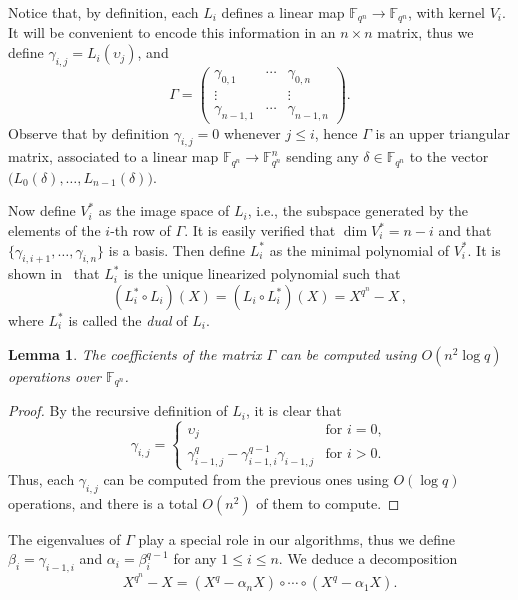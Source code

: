 \documentclass{sig-alternate}
\newcommand{\ff}[1]{\mathbb{F}_{#1}}
\newcommand{\qq}{q}
\newcommand{\nn}{n}
\newcommand{\qn}{{\qq^\nn}}
\newcommand{\extf}{\ff{\qn}}
\newcounter{algo}
\newtheorem{Lem}{Lemma}
\begin{document}
Notice that, by definition, each $L_i$ defines a linear map
$\extf\to\extf$, with kernel $V_i$. It will be convenient to encode
this information in an $\nn\times\nn$ matrix, thus we define
$\gamma_{i,j}=L_i(\upsilon_j)$, and
\begin{equation}
  \label{eq:Gamma}
  \Gamma =
  \begin{pmatrix}
    \gamma_{0,1} & \cdots & \gamma_{0,\nn}\\
    \vdots & & \vdots\\
    \gamma_{\nn-1,1} & \cdots & \gamma_{\nn-1,\nn}
  \end{pmatrix}.
\end{equation}
Observe that by definition $\gamma_{i,j}=0$ whenever $j\le i$, hence
$\Gamma$ is an upper triangular matrix, associated to a linear map
$\extf\to\extf^\nn$ sending any $\delta\in\extf$ to the vector
$\bigl(L_0(\delta),\dots,\allowbreak L_{n-1}(\delta)\bigr)$.  

Now define $V_i^\ast$ as the image space of $L_i$, i.e., the subspace
generated by the elements of the $i$-th row of $\Gamma$.  It is easily verified that
$\dim V_i^\ast=n-i$ and that $\{\gamma_{i,i+1},\dots,\gamma_{i,\nn}\}$
is a basis. Then define $L_i^\ast$ as the minimal polynomial of
$V_i^\ast$. It is shown in~\cite[Ch. 11]{mBER84a} that
$L_i^\ast$ is the unique linearized polynomial such that
$$(L_i^\ast \circ L_i)(X)=(L_i \circ L_i^\ast)(X)=X^\qn-X\,,$$
where $L_i^\ast$ is called the \emph{dual} of $L_i$.

\begin{Lem}
  The coefficients of the matrix $\Gamma$ can be computed using
  $O(\nn^2\log\qq)$ operations over $\extf$.
\end{Lem}
\begin{proof}
  By the recursive definition of $L_i$, it is clear that
  \begin{equation}
    \gamma_{i,j} =
    \begin{cases}
      \upsilon_j &\text{for $i=0$},\\
      \gamma_{i-1,j}^\qq - \gamma_{i-1,i}^{\qq-1}\gamma_{i-1,j} &\text{for $i>0$}.
    \end{cases}
  \end{equation}
  Thus, each $\gamma_{i,j}$ can be computed from the previous ones
  using $O(\log\qq)$ operations, and there is a total $O(\nn^2)$ of
  them to compute.
\end{proof}

The eigenvalues of $\Gamma$ play a special role in our algorithms,
thus we define $\beta_i=\gamma_{i-1,i}$ and $\alpha_i=\beta_i^{\qq-1}$
for any $1\le i \le \nn$. We deduce a decomposition
\begin{equation}
\label{decomposition_field_eq_gen}
  X^\qn - X = (X^\qq - \alpha_\nn X) \circ \cdots \circ (X^\qq - \alpha_1 X).
\end{equation}
\end{document}

